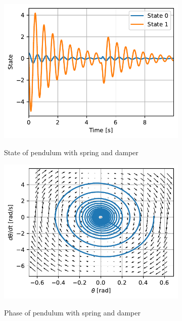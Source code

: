 \documentclass{cmc}
\begin{document}
\begin{figure}[H]
  \centering
  \begin{subfigure}[b]{0.49\textwidth}
    { \centering
      \includegraphics[width=\textwidth]{figures/State_Spring_Damper_(x0_=_[0dot5,_0dot1]).pdf}
    }
    \caption{State of pendulum with spring and damper}
    \label{fig:state-pendulum-spring-damper}
  \end{subfigure}
  \begin{subfigure}[b]{0.49\textwidth}
    { \centering
      \includegraphics[width=\textwidth]{figures/Phase_Spring_Damper_(x0_=_[0dot5,_0dot1]).pdf}
    }
    \caption{Phase of pendulum with spring and damper}
    \label{fig:phase-pendulum-spring-damper}
  \end{subfigure}
  \caption{}
  \label{fig:pendulum-spring-damper}
\end{figure}
\end{document}
